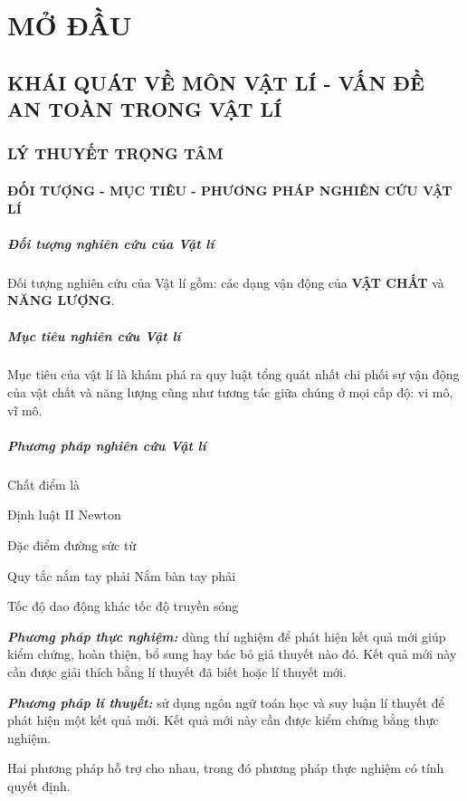 \chapter{MỞ ĐẦU}
\section{KHÁI QUÁT VỀ MÔN VẬT LÍ - VẤN ĐỀ AN TOÀN TRONG VẬT LÍ}
\subsection{LÝ THUYẾT TRỌNG TÂM}
\begin{tomtat}
	\subsubsection{ĐỐI TƯỢNG - MỤC TIÊU - PHƯƠNG PHÁP NGHIÊN CỨU VẬT LÍ}
	\paragraph{Đối tượng nghiên cứu của Vật lí}
	Đối tượng nghiên cứu của Vật lí gồm: các dạng vận động của \textbf{VẬT CHẤT} và \textbf{NĂNG LƯỢNG}.
	\paragraph{Mục tiêu nghiên cứu Vật lí}
	Mục tiêu của vật lí là khám phá ra quy luật tổng quát nhất chi phối sự vận động của vật chất và năng lượng cũng như tương tác giữa chúng ở mọi cấp độ: vi mô, vĩ mô.
	\paragraph{Phương pháp nghiên cứu Vật lí}
	\begin{dn}
		Chất điểm là 
	\end{dn}
	\begin{dl}
		Định luật II Newton
	\end{dl}
	\begin{tc}
		Đặc điểm đường sức từ
	\end{tc}
	\begin{noidung}{Quy tắc nắm tay phải}
		Nắm bàn tay phải
	\end{noidung}
	\begin{luuy}
		Tốc độ dao động khác tốc độ truyền sóng
	\end{luuy}
	\begin{dn}
		\textbf{\textit{Phương pháp thực nghiệm:}} dùng thí nghiệm để phát hiện kết quả mới giúp kiểm chứng, hoàn thiện, bổ sung hay bác bỏ giả thuyết nào đó. Kết quả mới này cần được giải thích bằng lí thuyết đã biết hoặc lí thuyết mới.
	\end{dn}
	\begin{dn}
		\textbf{\textit{Phương pháp lí thuyết:}} sử dụng ngôn ngữ toán học và suy luận lí thuyết để phát hiện một kết quả mới. Kết quả mới này cần được kiểm chứng bằng thực nghiệm.
	\end{dn}
	\begin{note}
		Hai phương pháp hỗ trợ cho nhau, trong đó phương pháp thực nghiệm có tính quyết định.
	\end{note}

\end{tomtat}
